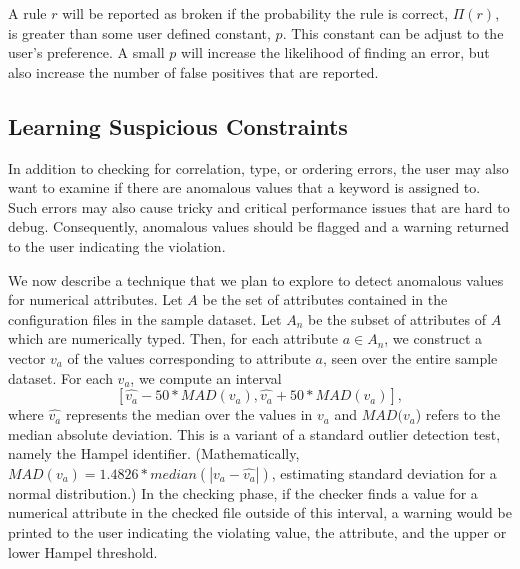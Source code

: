 

A rule $r$ will be reported as broken if the probability the rule is
correct, $\Pi(r)$, is greater than some user defined constant, $p$. This
constant can be adjust to the user's preference. A small $p$ will
increase the likelihood of finding an error, but also increase the
number of false positives that are reported.
\fi

\subsection{Learning Suspicious Constraints}
\label{subsec-constraints}

In addition to checking for correlation, type, or ordering errors, 
the user may also want to examine if there are anomalous values that 
a keyword is assigned to. Such errors may also cause tricky and critical performance issues that are hard to debug.
Consequently, anomalous values should be flagged and a warning returned
to the user indicating the violation.

We now describe a technique that we plan to 
explore to detect anomalous values for 
numerical attributes. Let $A$ be the set of attributes contained in the 
configuration files in the sample dataset. 
Let $A_n$ be the subset of attributes of $A$ which are numerically typed. 
Then, for each attribute $a \in A_n$, we construct a vector $v_a$ of the 
values corresponding to attribute $a$, seen over the entire sample dataset.
For each $v_a$, we compute 
an interval  $$[\hat{v_a} - 50*MAD(v_a), \hat{v_a} + 50*MAD(v_a)],$$ 
where $\hat{v_a}$ represents the median over the values 
in $v_a$ and $MAD(v_a$) refers to the 
median absolute deviation. 
This is a variant of a standard outlier detection test, namely the Hampel identifier. (Mathematically, $MAD(v_a) = 1.4826* median(|v_a - \hat{v_a}|)$, estimating standard deviation 
for a normal distribution.) 
In the checking phase, if the checker finds a value for a numerical 
attribute in the checked file outside of this interval, 
a warning would be printed to the user indicating the violating value, 
the attribute, and the upper or lower Hampel threshold. 


